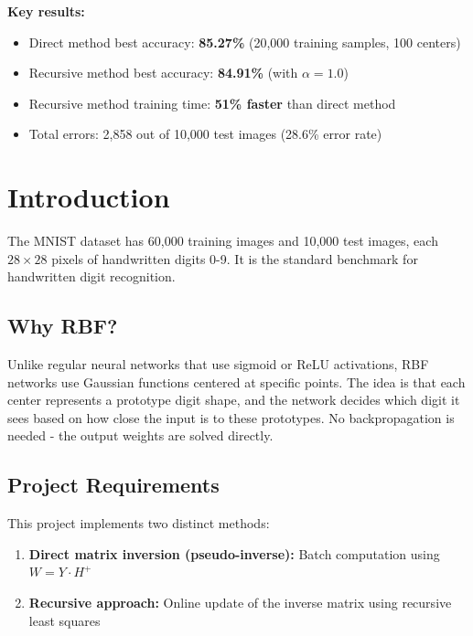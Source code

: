 \documentclass[12pt]{article}
\begin{document}
	\textbf{Key results:}
	\begin{itemize}
		\item Direct method best accuracy: \textbf{85.27\%} (20,000 training samples, 100 centers)
		\item Recursive method best accuracy: \textbf{84.91\%} (with $\alpha = 1.0$)
		\item Recursive method training time: \textbf{51\% faster} than direct method
		\item Total errors: 2,858 out of 10,000 test images (28.6\% error rate)
	\end{itemize}
	
	\newpage
	\tableofcontents
	\newpage
	
	\section{Introduction}
	
	The MNIST dataset has 60,000 training images and 10,000 test images, each $28 \times 28$ pixels of handwritten digits 0-9. It is the standard benchmark for handwritten digit recognition.
	
	\subsection{Why RBF?}
	
	Unlike regular neural networks that use sigmoid or ReLU activations, RBF networks use Gaussian functions centered at specific points. The idea is that each center represents a prototype digit shape, and the network decides which digit it sees based on how close the input is to these prototypes. No backpropagation is needed - the output weights are solved directly.
	
	\subsection{Project Requirements}
	
	This project implements two distinct methods:
	\begin{enumerate}
		\item \textbf{Direct matrix inversion (pseudo-inverse):} Batch computation using $W = Y \cdot H^+$
		\item \textbf{Recursive approach:} Online update of the inverse matrix using recursive least squares
	\end{enumerate}
	
\end{document}
